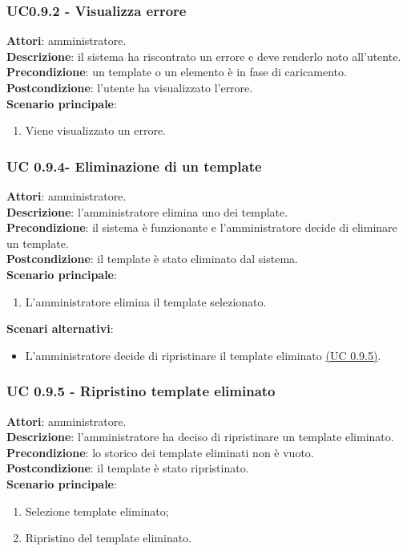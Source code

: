 \subsubsection{UC0.9.2 - Visualizza errore}{
	\label{uc0.9.2}
	\textbf{Attori}: amministratore. \\
	\textbf{Descrizione}: il sistema ha riscontrato un errore e deve renderlo noto all'utente. \\
	\textbf{Precondizione}: un template o un elemento è in fase di caricamento.	\\
	\textbf{Postcondizione}: l'utente ha visualizzato l'errore.	\\
	\textbf{Scenario principale}:
	\begin{enumerate}
		\item Viene visualizzato un errore.
	\end{enumerate}
	}
\subsubsection{UC 0.9.4- Eliminazione di un template}{
	\label{uc0.9.4}
	\textbf{Attori}: amministratore. \\
	\textbf{Descrizione}: l'amministratore elimina uno dei template. \\
	\textbf{Precondizione}: il sistema è funzionante e l'amministratore decide di eliminare un template.	\\
	\textbf{Postcondizione}: il template è stato eliminato dal sistema.	\\
	\textbf{Scenario principale}:
	\begin{enumerate}
		\item L’amministratore elimina il template selezionato.
	\end{enumerate}
	\textbf{Scenari alternativi}:
	\begin{itemize}
		\item L'amministratore decide di ripristinare il template eliminato \hyperref[uc0.9.5]{(UC 0.9.5)}.
	\end{itemize}
	}
\subsubsection{UC 0.9.5 - Ripristino template eliminato}{
	\label{uc0.9.5}
	\textbf{Attori}: amministratore. \\
	\textbf{Descrizione}: l'amministratore ha deciso di ripristinare un template eliminato. \\
	\textbf{Precondizione}: lo storico dei template eliminati non è vuoto.	\\
	\textbf{Postcondizione}: il template è stato ripristinato.	\\
	\textbf{Scenario principale}:
	\begin{enumerate}
		\item Selezione template eliminato; 
		\item Ripristino del template eliminato.
	\end{enumerate}
	}

